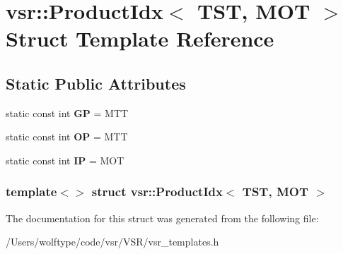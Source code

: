 \hypertarget{structvsr_1_1_product_idx_3_01_t_s_t_00_01_m_o_t_01_4}{\section{vsr\-:\-:Product\-Idx$<$ T\-S\-T, M\-O\-T $>$ Struct Template Reference}
\label{structvsr_1_1_product_idx_3_01_t_s_t_00_01_m_o_t_01_4}
}
\subsection*{Static Public Attributes}
\begin{DoxyCompactItemize}
\item 
\hypertarget{structvsr_1_1_product_idx_3_01_t_s_t_00_01_m_o_t_01_4_adaf05246d3937d973d30501cb7d359eb}{static const int {\bfseries G\-P} = M\-T\-T}\label{structvsr_1_1_product_idx_3_01_t_s_t_00_01_m_o_t_01_4_adaf05246d3937d973d30501cb7d359eb}

\item 
\hypertarget{structvsr_1_1_product_idx_3_01_t_s_t_00_01_m_o_t_01_4_ad60c921587efc91093c326f180b30adb}{static const int {\bfseries O\-P} = M\-T\-T}\label{structvsr_1_1_product_idx_3_01_t_s_t_00_01_m_o_t_01_4_ad60c921587efc91093c326f180b30adb}

\item 
\hypertarget{structvsr_1_1_product_idx_3_01_t_s_t_00_01_m_o_t_01_4_a1c7828583c3d128367a2c387889ed408}{static const int {\bfseries I\-P} = M\-O\-T}\label{structvsr_1_1_product_idx_3_01_t_s_t_00_01_m_o_t_01_4_a1c7828583c3d128367a2c387889ed408}

\end{DoxyCompactItemize}
\subsubsection*{template$<$$>$ struct vsr\-::\-Product\-Idx$<$ T\-S\-T, M\-O\-T $>$}



The documentation for this struct was generated from the following file\-:\begin{DoxyCompactItemize}
\item 
/\-Users/wolftype/code/vsr/\-V\-S\-R/vsr\-\_\-templates.\-h\end{DoxyCompactItemize}
